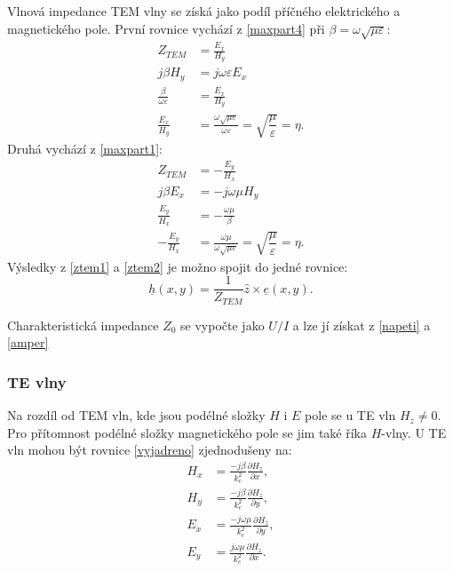 \documentclass[12pt,a4paper,oneside]{article}
\numberwithin{equation}{section} %
\numberwithin{figure}{section} %
\numberwithin{table}{section} %
\newcommand{\faz}[1]{{\underline{#1}}} %
\begin{document}
Vlnová impedance TEM vlny se získá jako podíl příčného elektrického a magnetického pole. První rovnice vychází z \ref{maxpart4} při $\beta = \omega \sqrt{\mu \varepsilon}$:
\begin{subequations}
\label{ztem1}
\begin{align}
Z_{TEM} &= \frac{E_x}{H_y}
\\
j \beta H_y &= j \omega \varepsilon E_x
\\
\frac{\beta}{\omega \varepsilon} &= \frac{E_x}{H_y}
\\
\frac{E_x}{H_y} &= \frac{\omega \sqrt{\mu \varepsilon}}{\omega \varepsilon} = \sqrt{\dfrac{\mu}{\varepsilon}} = \eta .
\end{align}
\end{subequations}
Druhá vychází z \ref{maxpart1}:
\begin{subequations}
\label{ztem2}
\begin{align}
Z_{TEM} &= - \frac{E_y}{H_x}
\\
j \beta E_x &= - j \omega \mu H_y
\\
\frac{E_y}{H_x} &= - \frac{\omega \mu}{\beta}
\\
- \frac{E_y}{H_x} &= \frac{\omega \mu}{\omega \sqrt{\mu \varepsilon}} = \sqrt{\dfrac{\mu}{\varepsilon}} = \eta .
\end{align}
\end{subequations}
Výsledky z \ref{ztem1} a \ref{ztem2} je možno spojit do jedné rovnice:
\begin{equation}
\faz{h} (x, y) = \frac{1}{Z_{TEM}} \hat{z} \times \faz{e} (x, y) .
\end{equation}

Charakteristická impedance $Z_0$ se vypočte jako $U / I$ a lze jí získat z \ref{napeti} a \ref{amper}

\subsubsection{TE vlny}
Na rozdíl od TEM vln, kde jsou podélné složky $H$ i $E$ pole se u TE vln $H_z  \neq 0$. Pro přítomnost podélné složky magnetického pole se jim také říka $H$-vlny. U TE vln mohou být rovnice \ref{vyjadreno} zjednodušeny na:
\begin{subequations}
\begin{align}
H_x &= \frac{-j \beta}{k^2_c} \frac{\partial H_z}{\partial x} ,
\\
H_y &= \frac{-j \beta}{k^2_c} \frac{\partial H_z}{\partial y} ,
\\
E_x &= \frac{-j \omega \mu}{k^2_c} \frac{\partial H_z}{\partial y} ,
\\
E_y &= \frac{j \omega \mu}{k^2_c} \frac{\partial H_z}{\partial x} .
\end{align}
\end{subequations}
\end{document}
